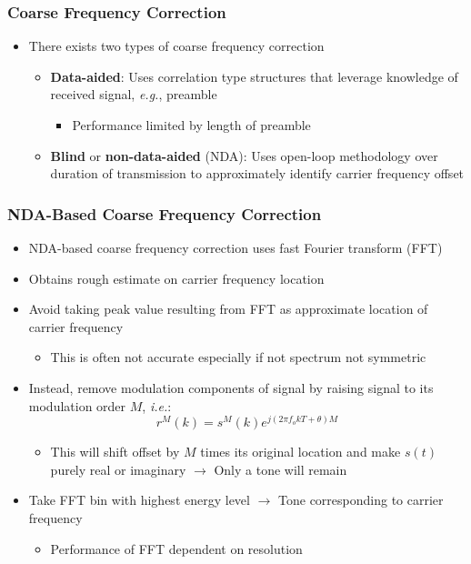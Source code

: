 \documentclass[10pt]{beamer}
\begin{document}

\frame
{
  \frametitle{Coarse Frequency Correction}

  \begin{itemize}
   \item There exists two types of coarse frequency correction
   \begin{itemize}
    \item \textbf{Data-aided}: Uses correlation type structures that leverage knowledge of received signal, \textit{e.g.}, preamble
    \begin{itemize}
     \item Performance limited by length of preamble
    \end{itemize}
    \item \textbf{Blind} or \textbf{non-data-aided} (NDA): Uses open-loop methodology over duration of transmission to approximately identify carrier frequency offset
   \end{itemize}
  \end{itemize}

}


\frame
{
  \frametitle{NDA-Based Coarse Frequency Correction}

  \begin{itemize}
   \item NDA-based coarse frequency correction uses fast Fourier transform (FFT)
   \item Obtains rough estimate on carrier frequency location
   \item Avoid taking peak value resulting from FFT as approximate location of carrier frequency
   \begin{itemize}
    \item This is often not accurate especially if not spectrum not symmetric
   \end{itemize}
  \item Instead, remove modulation components of signal by raising signal to its modulation order $M$, \textit{i.e.}:
  \begin{equation}
   r^M(k)=s^M(k)e^{j(2\pi{f_o}kT+\theta)M}
  \end{equation}
  \begin{itemize}
   \item This will shift offset by $M$ times its original location and make $s(t)$ purely real or imaginary $\rightarrow$ Only a tone will remain
  \end{itemize}
  \item Take FFT bin with highest energy level $\rightarrow$ Tone corresponding to carrier frequency
  \begin{itemize}
   \item Performance of FFT dependent on resolution
  \end{itemize}
  \end{itemize}

}

\end{document}
